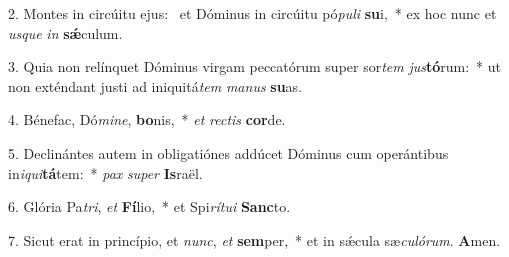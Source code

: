 2. Montes in circúitu ejus: \dag\  et Dóminus in circúitu pó\textit{pu}\textit{li} \textbf{su}i,~*  ex hoc nunc et \textit{us}\textit{que} \textit{in} \textbf{sǽ}culum.\

3. Quia non relínquet Dóminus virgam peccatórum super sor\textit{tem} \textit{jus}\textbf{tó}rum:~*  ut non exténdant justi ad iniquitá\textit{tem} \textit{ma}\textit{nus} \textbf{su}as.\

4. Bénefac, Dó\textit{mi}\textit{ne}, \textbf{bo}nis,~*  \textit{et} \textit{rec}\textit{tis} \textbf{cor}de.\

5. Declinántes autem in obligatiónes addúcet Dóminus cum operántibus in\textit{i}\textit{qui}\textbf{tá}tem:~*  \textit{pax} \textit{su}\textit{per} \textbf{Is}raël.\

6. Glória Pa\textit{tri}, \textit{et} \textbf{Fí}lio,~*  et Spi\textit{rí}\textit{tu}\textit{i} \textbf{Sanc}to.\

7. Sicut erat in princípio, et \textit{nunc}, \textit{et} \textbf{sem}per,~*  et in sǽcula sæ\textit{cu}\textit{ló}\textit{rum}. \textbf{A}men.\


